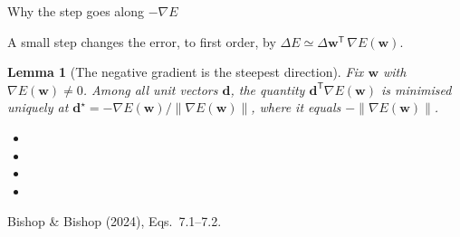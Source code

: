 \documentclass[aspectratio=169, 11pt]{beamer}
\newtheorem{lemmax}[theorem]{Lemma}
\newcommand{\srcline}[1]{%
  \par\vspace{0.25em}%
  {\scriptsize\color{mcMuted}\hfill #1\par}}
\newcommand{\src}[3]{}      %
\begin{document}
\begin{frame}{Why the step goes along $-\nabla E$}
  \src{bishop2024}{equation}{7.1-7.2}
  \src{bishop2024}{section}{7.1}
  \vspace{0.2em}
  A small step changes the error, to first order, by
  $\Delta E \simeq \Delta \mathbf{w}^{\mathsf T}\,\nabla E(\mathbf{w})$.
  \vspace{-0.15em}
  \begin{lemmax}[The negative gradient is the steepest direction]\label{th:steep}
    \small
    Fix $\mathbf{w}$ with $\nabla E(\mathbf{w}) \neq 0$. Among all unit vectors $\mathbf{d}$, the
    quantity $\mathbf{d}^{\mathsf T}\nabla E(\mathbf{w})$ is minimised uniquely at
    $\mathbf{d}^\star = -\nabla E(\mathbf{w}) / \|\nabla E(\mathbf{w})\|$, where it equals
    $-\|\nabla E(\mathbf{w})\|$.
  \end{lemmax}
  \vspace{0.1em}
  {\footnotesize
  \begin{itemize}\itemsep0.28em
    \item {}
    \item {}
    \item {}
    \item {}
  \end{itemize}}
  \srcline{Bishop \& Bishop (2024), Eqs.~7.1--7.2.}
\end{frame}
\end{document}

